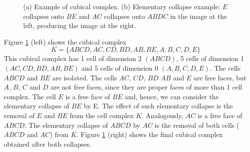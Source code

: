 \documentclass[journal]{IEEEtran}
\begin{document}
\begin{figure}[t]
\begin{center}
\end{center}
 \caption{\label{Fig1} (a) Example of cubical complex. (b) Elementary collapse example: $E$ collapses onto $BE$ and
 $AC$ collapses onto $ABDC$ in the image at the left, producing the image at the
 right.}
\end{figure}

Figure \ref{Fig1} (left) shows the cubical complex
$$K=\{ABCD,AC,CD,BD,AB,BE,A,B,C,D,E\}$$ This cubical complex has 1 cell of
dimension 2 $(ABCD)$, 5 cells of dimension 1 $(AC,CD,BD,AB,BE)$ and 5 cells of
dimension 0 $(A,B,C,D,E)$. The cells $ABCD$ and $BE$ are isolated. The cells
$AC$, $CD$, $BD$ $AB$ and $E$ are free faces, but $A$, $B$, $C$ and $D$ are not
free faces, since they are proper faces of more than 1 cell complex.
The cell
$E$ is a free face of $BE$ and, hence, we can consider the elementary collapse
of $BE$ by E. The effect of such elementary collapse is the removal of $E$ and
$BE$ from the cell complex $K$. Analogously, $AC$ is a free face of $ABCD$. The
elementary collapse of $ABCD$ by $AC$ is the removal of both cells ($ABCD$ and
$AC$) from $K$. Figure \ref{Fig1} (right) shows the final cubical complex
obtained after both collapses.
\end{document}
